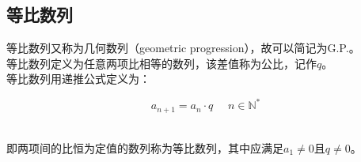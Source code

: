\documentclass[UTF8]{ctexart}
\begin{document}
\newpage
    
\subsection{等比数列}
    等比数列又称为几何数列（geometric progression），故可以简记为G.P.。\\[3mm]
    等比数列定义为任意两项比相等的数列，该差值称为公比，记作$q$。\\[3mm]
    等比数列用递推公式定义为：
    \begin{large}
        \begin{equation*}
            a_{n+1}=a_n\cdot q~~~~~~n\in\mathbb{N^*}
        \end{equation*}
    \end{large}\\
    即两项间的比恒为定值的数列称为等比数列，其中应满足$a_1\neq 0$且$q\neq 0$。
\end{document}
